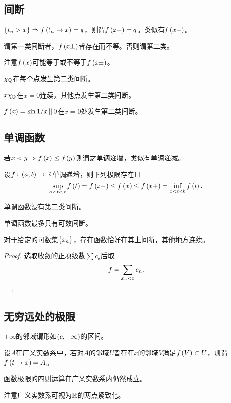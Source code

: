 \documentclass{ctexrep}
\begin{document}
  \subsection{间断}
  \begin{definition}
    $\left\{t_n>x\right\}\Rightarrow f\left(t_n\rightarrow x\right) = q$，则谓$f\left(x+\right)=q$。类似有$f\left(x-\right)$。
  \end{definition}
  \begin{definition}
    谓第一类间断者，$f\left(x\pm\right)$皆存在而不等。否则谓第二类。
  \end{definition}
  注意$f\left(x\right)$可能等于或不等于$f\left(x\pm\right)$。
  \begin{ex}
    $\chi_{\mathbb{Q}}$在每个点发生第二类间断。
  \end{ex}
  \begin{ex}
    $x\chi_{\mathbb{Q}}$在$x=0$连续，其他点发生第二类间断。
  \end{ex}
  \begin{ex}
    $f\left(x\right)=\sin 1/x \, || \, 0$在$x=0$处发生第二类间断。
  \end{ex}
  \subsection{单调函数}
  \begin{definition}
    若$x<y\Rightarrow f\left(x\right)\le f\left(y\right)$则谓之单调递增，类似有单调递减。
  \end{definition}
  \begin{theorem}
    设$f:\, \left(a,b\right) \rightarrow \mathbb{R}$单调递增，则下列极限存在且
    \[ \sup_{a<t<x} f\left(t\right) = f\left(x-\right) \le f\left(x\right)\le f\left(x+\right)=\inf_{x<t<b} f\left(t\right). \]
  \end{theorem}
  \begin{corollary}
    单调函数没有第二类间断。
  \end{corollary}
  \begin{theorem}
    单调函数最多只有可数间断。
  \end{theorem}
  \begin{theorem}
    对于给定的可数集$\left\{x_n\right\}$，存在函数恰好在其上间断，其他地方连续。
  \end{theorem}
  \begin{proof}
    选取收敛的正项级数$\sum c_n$后取
    \[ f= \sum_{x_n<x} c_n. \qedhere \]
  \end{proof}
  \subsection{无穷远处的极限}
  \begin{definition}
    $+\infty$的邻域谓形如$\left(c,+\infty\right)$的区间。
  \end{definition}
  \begin{definition}
    设$A$在广义实数系中，若对$A$的邻域$U$皆存在$x$的邻域$V$满足$f\left(V\right)\subset U$，则谓$f\left(t\rightarrow x\right) = A$。
  \end{definition}
  \begin{theorem}
    函数极限的四则运算在广义实数系内仍然成立。
  \end{theorem}
  注意广义实数系可视为$\mathbb{R}$的两点紧致化。
 
\ifx\allfiles\undefined %
\end{document}
